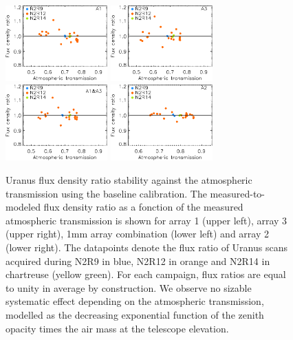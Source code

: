 \begin{figure}[ht!]
  \begin{center}
    \includegraphics[clip=true, trim={0, -0.3cm, -0.3cm, 0}, width=0.35\textwidth]{Figures/Calibration/plot_flux_density_ratio_obstau_uranus_corrected_skydip_narrow_a1.pdf}
    \includegraphics[clip=true, trim={0, -0.3cm, -0.3cm, 0}, width=0.35\textwidth]{Figures/Calibration/plot_flux_density_ratio_obstau_uranus_corrected_skydip_narrow_a3.pdf}
    \includegraphics[clip=true, trim={0, -0.3cm, -0.3cm, 0}, width=0.35\textwidth]{Figures/Calibration/plot_flux_density_ratio_obstau_uranus_corrected_skydip_narrow_1mm.pdf}
    \includegraphics[clip=true, trim={0, -0.3cm, -0.3cm, 0}, width=0.35\textwidth]{Figures/Calibration/plot_flux_density_ratio_obstau_uranus_corrected_skydip_narrow_a2.pdf}
    \caption[Uranus flux density stability against atmospheric
      transmission]{Uranus flux density ratio stability against the
      atmospheric transmission using the baseline calibration.
      The measured-to-modeled flux density
      ratio as a fonction of the measured atmospheric transmission is
      shown for array 1 (upper left), array 3 (upper right), 1mm array
      combination (lower left) and array 2 (lower right).
      The datapoints denote the flux ratio of Uranus scans acquired
      during N2R9 in blue, N2R12 in orange and N2R14 in chartreuse
      (yellow green).
      For each campaign, flux ratios are equal to unity in average by
      construction. We observe no sizable systematic effect depending
      on the atmospheric transmission, modelled as the decreasing exponential
      function of the zenith opacity times the air mass at the
      telescope elevation.}
\label{fig:uranus_flux_obstau}
\end{center}
\end{figure}


